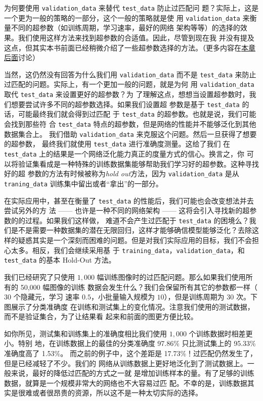 为何要使用 \lstinline!validation_data! 来替代 \lstinline!test_data! 防止过匹配问
题？实际上，这是一个更为一般的策略的一部分，这个一般的策略就是使
用 \lstinline!validation_data! 来衡量不同的超参数（如训练周期，学习速率，最好的网络
架构等等）的选择的效果。我们使用这样方法来找到超参数的合适值。因此，尽管到现在我
并没有提及这点，但其实本书前面已经稍微介绍了一些超参数选择的方法。（更多内容在\hyperref[sec:how_to_choose_a_neural_network's_hyper-parameters]{本章后面}讨论）

当然，这仍然没有回答为什么我们用 \lstinline!validation_data! 而不是 \lstinline!test_data!
来防止过匹配的问题。实际上，有一个更加一般的问题，就是为何
用 \lstinline!validation_data! 取代 \lstinline!test_data! 来设置更好的超参数？为
了理解这点，想想当设置超参数时，我们想要尝试许多不同的超参数选择。如果我们设置超
参数是基于 \lstinline!test_data! 的话，可能最终我们就会得到过匹配
于 \lstinline!test_data!  的超参数。也就是说，我们可能会找到那些符
合 \lstinline!test_data! 特点的超参数，但是网络的性能并不能够泛化到其他数据集合上。
我们借助 \lstinline!validation_data! 来克服这个问题。然后一旦获得了想要的超参数，
最终我们就使用 \lstinline!test_data! 进行准确度测量。这给了我们
在 \lstinline!test_data! 上的结果是一个网络泛化能力真正的度量方式的信心。换言之，你
可以将验证集看成是一种特殊的训练数据集能够帮助我们学习好的超参数。这种寻找好的超
参数的方法有时候被称为\emph{hold out}方法，因为 \lstinline!validation_data! 是从
\lstinline!traning_data! 训练集中留出或者``拿出''的一部分。

在实际应用中，甚至在衡量了 \lstinline!test_data! 的性能后，我们可能也会改变想法并去尝试另外的方
法 —— 也许是一种不同的网络架构 —— 这将会引入寻找新的超参数的的过程。如果我们这样做，
难道不会产生过匹配于 \lstinline!test_data! 的困境么？我们是不是需要一种数据集的潜在无限回归，这样才能够确信模型能够泛化？去除这样的疑惑其实是一个深刻而困难的问题。但是对我们实际应用的目标，我们不会担心太多。相反，我们会继续采用基
于 \lstinline!training_data!，\lstinline!validation_data!，和
\lstinline!test_data! 的基本 Hold-Out 方法。

我们已经研究了只使用 $1,000$ 幅训练图像时的过匹配问题。那么如果我们使用所有的 50,000 幅图像的训练
数据会发生什么？我们会保留所有其它的参数都一样（$30$ 个隐藏元，学习
速率 $0.5$，小批量输入规模为 $10$），但是训练周期为 $30$ 次。下图展示了分类准确度
在训练和测试集上的变化情况。注意我们使用的测试数据，而不是验证集合，为了让结果看
起来和前面的图更方便比较。

如你所见，测试集和训练集上的准确度相比我们使用 $1,000$ 个训练数据时相差更小。特别
地，在训练数据上的最佳的分类准确度 97.86\% 只比测试集上的 95.33\% 准确度高了 1.53\%。
而之前的例子中，这个差距是 17.73\%！过匹配仍然发生了，但是已经减轻了不少。我们的
网络从训练数据上更好地泛化到了测试数据上。一般来说，最好的降低过匹配的方式之一就
是增加训练样本的量。有了足够的训练数据，就算是一个规模非常大的网络也不大容易过匹
配。不幸的是，训练数据其实是很难或者很昂贵的资源，所以这不是一种太切实际的选择。

